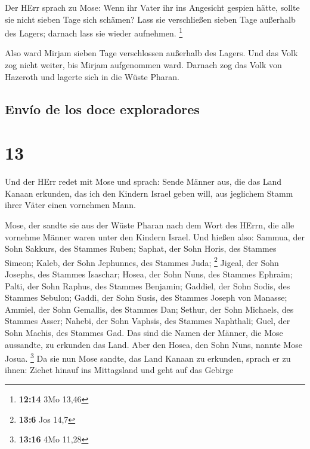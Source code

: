  Der HErr sprach zu Mose: Wenn ihr Vater ihr ins
Angesicht gespien hätte, sollte sie nicht sieben Tage sich schämen? Lass
sie verschließen sieben Tage außerhalb des Lagers; darnach lass sie
wieder aufnehmen. \footnote{\textbf{12:14} 3Mo 13,46}

 Also ward Mirjam sieben Tage verschlossen außerhalb des
Lagers. Und das Volk zog nicht weiter, bis Mirjam aufgenommen ward.
 Darnach zog das Volk von Hazeroth und lagerte sich in
die Wüste Pharan.

\hypertarget{envuxedo-de-los-doce-exploradores}{%
\subsection{Envío de los doce
exploradores}\label{envuxedo-de-los-doce-exploradores}}

\hypertarget{section-12}{%
\section{13}\label{section-12}}

 Und der HErr redet mit Mose und sprach: 
Sende Männer aus, die das Land Kanaan erkunden, das ich den Kindern
Israel geben will, aus jeglichem Stamm ihrer Väter einen vornehmen Mann.

 Mose, der sandte sie aus der Wüste Pharan nach dem Wort
des HErrn, die alle vornehme Männer waren unter den Kindern Israel.
 Und hießen also: Sammua, der Sohn Sakkurs, des Stammes
Ruben;  Saphat, der Sohn Horis, des Stammes Simeon;
 Kaleb, der Sohn Jephunnes, des Stammes Juda; \footnote{\textbf{13:6}
  Jos 14,7}  Jigeal, der Sohn Josephs, des Stammes
Isaschar;  Hosea, der Sohn Nuns, des Stammes Ephraim;
 Palti, der Sohn Raphus, des Stammes Benjamin;
 Gaddiel, der Sohn Sodis, des Stammes Sebulon;
 Gaddi, der Sohn Susis, des Stammes Joseph von Manasse;
 Ammiel, der Sohn Gemallis, des Stammes Dan;
 Sethur, der Sohn Michaels, des Stammes Asser;
 Nahebi, der Sohn Vaphsis, des Stammes Naphthali;
 Guel, der Sohn Machis, des Stammes Gad. 
Das sind die Namen der Männer, die Mose aussandte, zu erkunden das Land.
Aber den Hosea, den Sohn Nuns, nannte Mose Josua. \footnote{\textbf{13:16}
  4Mo 11,28}  Da sie nun Mose sandte, das Land Kanaan zu
erkunden, sprach er zu ihnen: Ziehet hinauf ins Mittagsland und geht auf
das Gebirge

